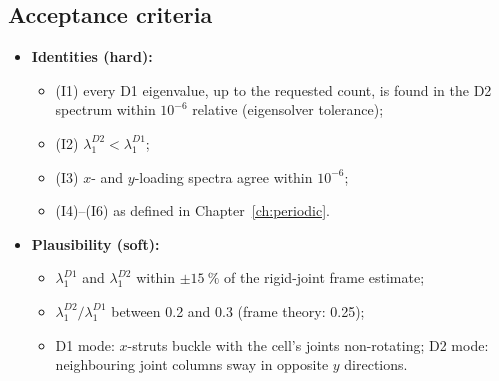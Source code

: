\documentclass[11pt,a4paper]{report}
\begin{document}
\subsection*{Acceptance criteria}
\begin{itemize}
\item \textbf{Identities (hard):}
  \begin{itemize}
  \item (I1) every D1 eigenvalue, up to the requested count, is found in the
    D2 spectrum within $10^{-6}$ relative (eigensolver tolerance);
  \item (I2) $\lambda_1^{D2}<\lambda_1^{D1}$;
  \item (I3) $x$- and $y$-loading spectra agree within $10^{-6}$;
  \item (I4)--(I6) as defined in Chapter~\ref{ch:periodic}.
  \end{itemize}
\item \textbf{Plausibility (soft):}
  \begin{itemize}
  \item $\lambda_1^{D1}$ and $\lambda_1^{D2}$ within $\pm\SI{15}{\percent}$ of
    the rigid-joint frame estimate;
  \item $\lambda_1^{D2}/\lambda_1^{D1}$ between 0.2 and 0.3 (frame theory:
    0.25);
  \item D1 mode: $x$-struts buckle with the cell's joints non-rotating;
    D2 mode: neighbouring joint columns sway in opposite $y$ directions.
  \end{itemize}
\end{itemize}
\end{document}
